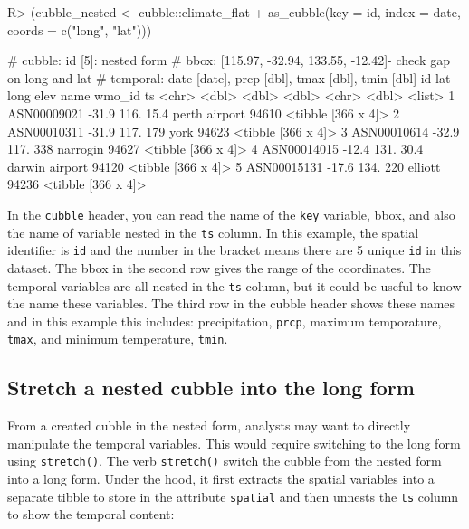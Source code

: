 \documentclass[
]{jss}
\begin{document}
\begin{CodeChunk}
\begin{CodeInput}
R> (cubble_nested <- cubble::climate_flat %
+   as_cubble(key = id, index = date, coords = c("long", "lat")))
\end{CodeInput}
\begin{CodeOutput}
# cubble:   id [5]: nested form
# bbox:     [115.97, -32.94, 133.55, -12.42]- check gap on long and lat
# temporal: date [date], prcp [dbl], tmax [dbl], tmin [dbl]
  id            lat  long  elev name           wmo_id ts                
  <chr>       <dbl> <dbl> <dbl> <chr>           <dbl> <list>            
1 ASN00009021 -31.9  116.  15.4 perth airport   94610 <tibble [366 x 4]>
2 ASN00010311 -31.9  117. 179   york            94623 <tibble [366 x 4]>
3 ASN00010614 -32.9  117. 338   narrogin        94627 <tibble [366 x 4]>
4 ASN00014015 -12.4  131.  30.4 darwin airport  94120 <tibble [366 x 4]>
5 ASN00015131 -17.6  134. 220   elliott         94236 <tibble [366 x 4]>
\end{CodeOutput}
\end{CodeChunk}

In the \texttt{cubble} header, you can read the name of the \texttt{key}
variable, bbox, and also the name of variable nested in the \texttt{ts}
column. In this example, the spatial identifier is \texttt{id} and the
number in the bracket means there are 5 unique \texttt{id} in this
dataset. The bbox in the second row gives the range of the coordinates.
The temporal variables are all nested in the \texttt{ts} column, but it
could be useful to know the name these variables. The third row in the
cubble header shows these names and in this example this includes:
precipitation, \texttt{prcp}, maximum temporature, \texttt{tmax}, and
minimum temperature, \texttt{tmin}.

\hypertarget{stretch-a-nested-cubble-into-the-long-form}{%
\subsection{Stretch a nested cubble into the long
form}\label{stretch-a-nested-cubble-into-the-long-form}}

From a created cubble in the nested form, analysts may want to directly
manipulate the temporal variables. This would require switching to the
long form using \texttt{stretch()}. The verb \texttt{stretch()} switch
the cubble from the nested form into a long form. Under the hood, it
first extracts the spatial variables into a separate tibble to store in
the attribute \texttt{spatial} and then unnests the \texttt{ts} column
to show the temporal content:
\end{document}

